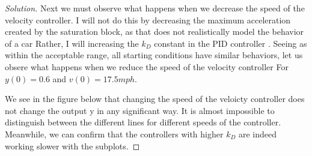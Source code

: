 \documentclass{article}
\begin{document}
\begin{proof}[Solution]
  Next we must observe what happens when we decrease the speed of the velocity controller. I will not do this by decreasing the  
  maximum acceleration created by the saturation block, as that does not realistically model the behavior of a car
  Rather, I will increasing the $k_D$ constant in the PID controller .
  Seeing as within the acceptable range, all starting conditions have similar behaviors, let us obsere what happens when we reduce the speed of the velocity controller For
  $y(0)=0.6$ and $v(0)=17.5mph$. \newline

  We see in the figure below that changing the speed of the veloicty controller does not change the output y in any significant way.
  It is almost impossible to distinguish between the different lines for different speeds of the controller. Meanwhile, we can confirm that the controllers with higher $k_D$
  are indeed working slower with the subplots.


\end{proof}
\end{document}
